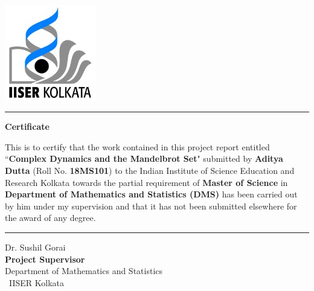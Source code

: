 \thispagestyle{plain}


\flushleft
\includegraphics[width=40mm]{logo.png}

\vspace{0.5\baselineskip}
\hrule
\vspace{3\baselineskip}

\begin{center}
	{\Large {\textbf{Certificate}}}
\end{center}

\vspace{\baselineskip}

\noindent This is to certify that the work contained in this project report entitled
``\textbf{Complex Dynamics and the Mandelbrot Set}" submitted by \textbf{Aditya Dutta} (Roll No. \textbf{18MS101}) to the Indian Institute of Science Education and Research Kolkata towards the partial requirement of \textbf{Master of Science} in \textbf{Department of Mathematics and Statistics (DMS)} has been carried out by him under my supervision and that it has not been submitted elsewhere for the award of any degree.

\vspace{3\baselineskip}
\begin{flushright}
	\begin{minipage}[c]{0.45\textwidth}
		\centering
		\vspace{3\baselineskip}
		\hrule
		\vspace{1.5\baselineskip}
		{\large Dr. Sushil Gorai} \bigskip\\
		{\large \textbf{Project Supervisor}} \\
		\large Department of Mathematics and Statistics ~\\\
		IISER Kolkata
	\end{minipage}
\end{flushright}
\vspace{\baselineskip}
\restoregeometry
